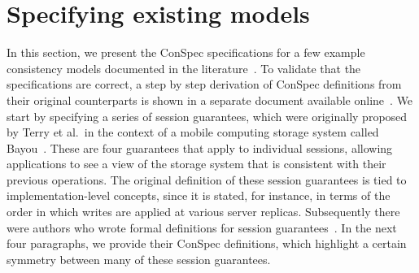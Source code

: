 \documentclass[journal,compsoc]{IEEEtran}
\begin{document}
  
 \section{Specifying existing models}\label{sec:list}
In this section, we present the ConSpec specifications for a few example %
 consistency models  documented in the literature~\cite{Chockler2000, Terry:1994:SGW:645792.668302, Burckhardt:2014:PEC:2693641.2693642}. To validate that the specifications are correct, a step by step derivation of  ConSpec definitions from their original counterparts is shown in a separate document available online~\cite{onlineappendix}. %
We start by specifying a series of session guarantees, which were originally proposed by Terry et al.\ in the context of a mobile computing storage system called Bayou~\cite{Terry:1994:SGW:645792.668302}. These are four guarantees that apply to individual sessions, allowing applications to see a view of the storage system that is consistent with their previous operations. The original definition of these session guarantees is tied to implementation-level concepts, since it is stated, for instance, in terms of the order in which writes are applied at various server replicas. Subsequently there were authors who wrote formal definitions for session guarantees~\cite{Chockler2000, Burckhardt:2014:PEC:2693641.2693642}. In the next four paragraphs, we provide their ConSpec definitions, which highlight a certain symmetry between many of these session guarantees.
\end{document}
